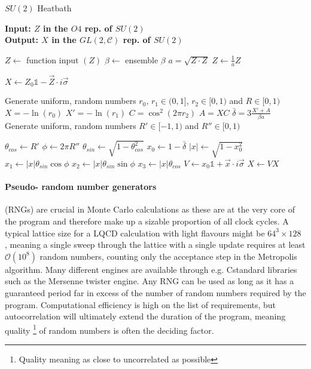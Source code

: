 \documentclass[a4paper,10pt]{article}
\newcommand{\CC}{C\nolinebreak\hspace{-.05em}\raisebox{.4ex}{\tiny\bf +}\nolinebreak\hspace{-.10em}\raisebox{.4ex}{\tiny\bf +}}
\def\CC{{C\nolinebreak[4]\hspace{-.05em}\raisebox{.4ex}{\tiny\bf ++}}}
\begin{document}
\begin{algorithm}[H]
\caption{$SU(2)$ Heatbath}\label{alg:SU2HB}
\hspace*{\algorithmicindent} \textbf{Input: $Z$ in the $O4$ rep. of $SU(2)$} \\
\hspace*{\algorithmicindent} \textbf{Output: $X$ in the $GL(2,\mathcal{C})$ rep. of $SU(2)$}
\begin{algorithmic}
\Ensure
\State $Z \gets $ function input $(Z)$
\State $\beta \gets $ ensemble $\beta$
\State $a=\sqrt{Z\cdot Z}$
\State $Z \gets \frac{1}{a}Z$

\State $X \gets Z_0\mathbb{1}-\vec{Z}\cdot i\vec{\sigma}$

\State Generate uniform, random numbers $r_0,\,r_1 \in (0,1]$,  $r_2 \in [0,1)$ and $R \in [0,1)$
\State $X = -\operatorname{ln}(r_0)$
\State $X' = -\operatorname{ln}(r_1)$
\State $C = \cos^2\left( 2\pi r_2 \right)$
\State $A = XC$
\State $\bar{\delta} = 3\frac{X'+A}{\beta a}$
\EndWhile
\State Generate uniform, random numbers $R'\in [-1,1)$ and $R'' \in [0,1)$

\State $\theta_{cos} \gets R'$
\State $\phi \gets 2\pi R''$
\State $\theta_{sin} \gets \sqrt{1-\theta_{cos}^2}$
\State $x_0 \gets 1-\bar{\delta}$
\State $|x| \gets \sqrt{1-x_0^2}$
\State $x_1 \gets |x|\theta_{sin}\cos{\phi}$
\State $x_2 \gets |x|\theta_{sin}\sin{\phi}$
\State $x_3 \gets |x|\theta_{cos}$
\State $V \gets x_0\mathbb{1}+\vec{x}\cdot i\vec{\sigma}$
\State $X\gets VX$
\end{algorithmic}
\end{algorithm}

\paragraph{Pseudo- random number generators} (RNGs) are crucial in Monte Carlo calculations as these are at the very core of the program and therefore make up a sizable proportion of all clock cycles. A typical lattice size for a LQCD calculation with light flavours might be $64^3\times 128$ \cite{tanabashi2018review}, meaning a single sweep through the lattice with a single update requires at least $\mathcal{O}(10^8)$ random numbers, counting only the acceptance step in the Metropolis algorithm. Many different engines are available through e.g. \CC standard libraries such as the Mersenne twister engine. Any RNG can be used as long as it has a guaranteed period far in excess of the number of random numbers required by the program. Computational efficiency is high on the list of requirements, but autocorrelation will ultimately extend the duration of the program, meaning quality \footnote{Quality meaning as close to uncorrelated as possible} of random numbers is often the deciding factor.
\end{document}

